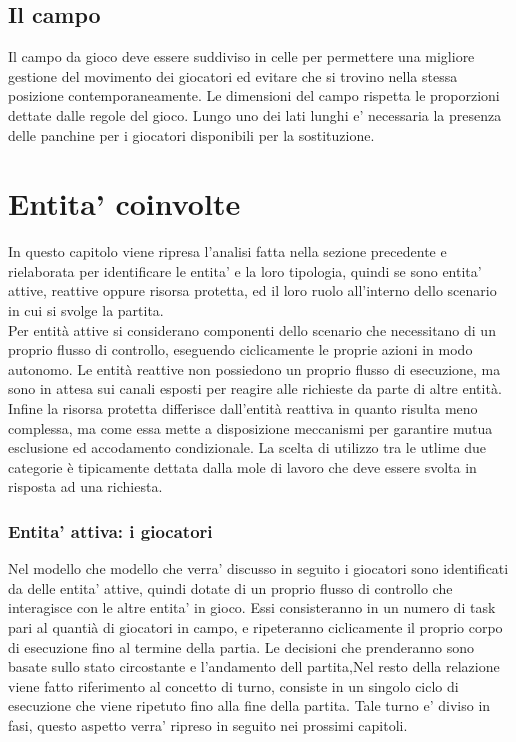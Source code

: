 \subsection{Il campo}
\label{sec:analisi_campo}

Il campo da gioco deve essere suddiviso in celle per permettere una migliore gestione del movimento dei giocatori ed evitare che si trovino nella stessa posizione contemporaneamente. Le dimensioni del campo rispetta le proporzioni dettate dalle regole del gioco. Lungo uno dei lati lunghi e' necessaria la presenza delle panchine per i giocatori disponibili per la sostituzione.

\section*{Entita' coinvolte}

In questo capitolo viene ripresa l'analisi fatta nella sezione precedente e rielaborata per identificare le entita' e la loro tipologia, quindi se sono entita' attive, reattive oppure risorsa protetta, ed il loro ruolo all'interno dello scenario in cui si svolge la partita.\\

Per entità attive si considerano componenti dello scenario che necessitano di un proprio flusso di controllo, eseguendo ciclicamente le proprie azioni in modo autonomo. Le entità reattive non possiedono un proprio flusso di esecuzione, ma sono in attesa sui canali esposti per reagire alle richieste da parte di altre entità. Infine la risorsa protetta differisce dall'entità reattiva in quanto risulta meno complessa, ma come essa mette a disposizione meccanismi per garantire mutua esclusione ed accodamento condizionale. La scelta di utilizzo tra le utlime due categorie è tipicamente dettata dalla mole di lavoro che deve essere svolta in risposta ad una richiesta.

\subsubsection{Entita' attiva: i giocatori}
\label{sec:entita_coinvolte_giocatori}

Nel modello che modello che verra' discusso in seguito i giocatori sono identificati da delle entita' attive, quindi dotate di un proprio flusso di controllo che interagisce con le altre entita' in gioco. Essi consisteranno in un numero di task pari al quantià di giocatori in campo, e ripeteranno ciclicamente il proprio corpo di esecuzione fino al termine della partia. Le decisioni che prenderanno sono basate sullo stato circostante e l'andamento dell partita,Nel resto della relazione viene fatto riferimento al concetto di turno, consiste in un singolo ciclo di esecuzione che viene ripetuto fino alla fine della partita. Tale turno e' diviso in fasi, questo aspetto verra' ripreso in seguito nei prossimi capitoli.

